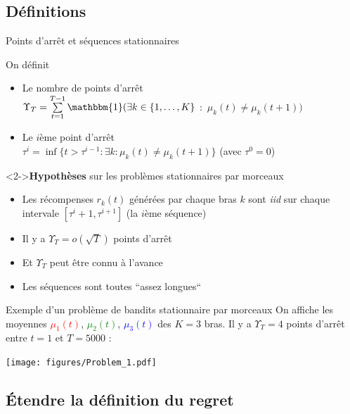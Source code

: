 \documentclass[11pt,french,ignorenonframetext,]{beamer}
\providecommand{\tightlist}{%
  \setlength{\itemsep}{0pt}\setlength{\parskip}{0pt}}
\begin{document}
\subsection{\hfill{}Définitions\hfill{}}

\begin{frame}{Points d'arrêt et séquences stationnaires}

  On définit

  \begin{itemize}
    \item
    Le nombre de points d'arrêt\\
    $\Upsilon_T = \sum\limits_{t=1}^{T-1} \mathbbm{1}(\exists k\in \{1,\dots,K\}$ $:$ $\mu_k(t) \neq \mu_k(t+1) )$

    \item
    Le $i$ème point d'arrêt\\
    $\tau^{i} = \inf\{t > \tau^{i-1} : \exists k : \mu_k(t) \neq \mu_k(t+1)\}$
    \hfill{} (avec $\tau^0=0$)
  \end{itemize}

  \begin{block}<2->{\textbf{Hypothèses} sur les problèmes stationnaires par morceaux}
    \begin{itemize}\tightlist
      \item Les récompenses $r_k(t)$ générées par chaque bras $k$ sont \alert{\emph{iid} sur chaque intervale} $[ \tau^{i} + 1, \tau^{i+1} ]$ (la $i$ème séquence)
      \item Il y a $\Upsilon_T = o(\sqrt{T})$ points d'arrêt
      \item Et \alert{$\Upsilon_T$ peut être connu à l'avance}
      \item Les séquences sont toutes ``assez longues``
  \end{itemize}
\end{block}
\end{frame}


\begin{frame}[plain]{Exemple d'un problème de bandits stationnaire par morceaux}
  On affiche les moyennes \textcolor{red}{$\mu_1(t)$}, \textcolor{green}{$\mu_2(t)$}, \textcolor{blue}{$\mu_3(t)$}
  des $K=3$ bras.
  Il y a $\Upsilon_T=4$ points d'arrêt entre $t=1$ et $T=5000$ :
  \begin{center}
    \texttt{[image: figures/Problem\_1.pdf]}
  \end{center}
\end{frame}


\subsection{\hfill{}Étendre la définition du regret\hfill{}}
\end{document}

